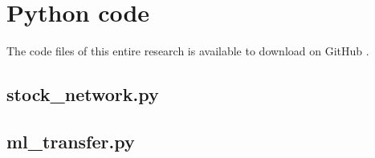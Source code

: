 \chapter{Python code}

The code files of this entire research is available to download on GitHub \cite{Lingjie2018}.

\section{stock\_network.py}
\label{sec:inp-eg}
%

%
{\fontsize{6pt}{6pt}\selectfont 

}

\section{ml\_transfer.py}
{\fontsize{6pt}{6pt}\selectfont 
	
}

